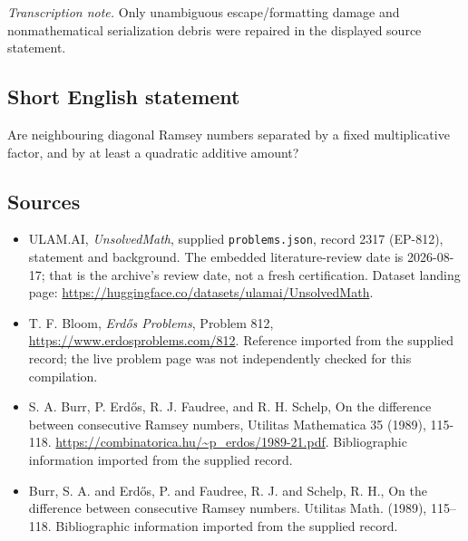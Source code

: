 \documentclass[11pt,a4paper]{article}
\begin{document}
{\small\emph{Transcription note.} Only unambiguous escape/formatting damage and nonmathematical serialization debris were repaired in the displayed source statement.}

\subsection{Short English statement}

Are neighbouring diagonal Ramsey numbers separated by a fixed multiplicative factor, and by at least a quadratic additive amount?

\subsection{Sources}

{\small

\begin{itemize}

\item[\hypertarget{source:2317:1}{S1}] ULAM.AI, \emph{UnsolvedMath}, supplied \texttt{problems.json}, record 2317 (EP-812), statement and background. The embedded literature-review date is 2026-08-17; that is the archive’s review date, not a fresh certification. Dataset landing page: \url{https://huggingface.co/datasets/ulamai/UnsolvedMath}.

\item[\hypertarget{source:2317:2}{S2}] T. F. Bloom, \emph{Erdős Problems}, Problem 812, \url{https://www.erdosproblems.com/812}. Reference imported from the supplied record; the live problem page was not independently checked for this compilation.

\item[\hypertarget{source:2317:3}{S3}] S. A. Burr, P. Erdős, R. J. Faudree, and R. H. Schelp, On the difference between consecutive Ramsey numbers, Utilitas Mathematica 35 (1989), 115-118. \url{https://combinatorica.hu/~p_erdos/1989-21.pdf}. Bibliographic information imported from the supplied record.

\item[\hypertarget{source:2317:4}{S4}] Burr, S. A. and Erd\H{o}s, P. and Faudree, R. J. and Schelp, R. H., On the difference between consecutive {R}amsey numbers. Utilitas Math. (1989), 115--118. Bibliographic information imported from the supplied record.

\end{itemize}

}

\label{end:2317}
\end{document}
